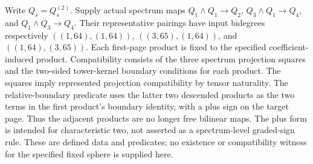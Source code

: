 \begin{definition}
  \label{def:h6-three-long-layer-products}
  \leanok
  Write $Q_s=Q_s^{(2)}$. Supply actual spectrum maps
  $Q_1\wedge Q_1\to Q_2$, $Q_3\wedge Q_1\to Q_4$, and
  $Q_1\wedge Q_3\to Q_4$. Their representative pairings have input
  bidegrees respectively $((1,64),(1,64))$, $((3,65),(1,64))$, and
  $((1,64),(3,65))$. Each first-page product is fixed to the specified
  coefficient-induced product. Compatibility consists of the three
  spectrum projection squares and the two-sided tower-kernel boundary
  conditions for each product. The squares imply represented projection
  compatibility by tensor naturality.
  The relative-boundary predicate uses the latter two descended products
  as the two terms in the first product's boundary identity, with a plus
  sign on the target page. Thus the adjacent products are no longer free
  bilinear maps. The plus form is intended for characteristic two, not
  asserted as a spectrum-level graded-sign rule.
  These are defined data and predicates; no existence or compatibility
  witness for the specified fixed sphere is supplied here.
\end{definition}

